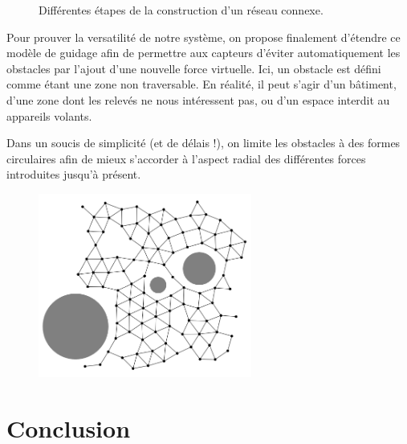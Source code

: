 \documentclass[10pt]{article}
\begin{document}
\begin{figure}[p]

  \caption{Différentes étapes de la construction d'un réseau connexe.}
  \label{demo}

\end{figure}

\begin{multicols}{2}

Pour prouver la versatilité de notre système, on propose finalement
d'étendre ce modèle de guidage afin de permettre aux capteurs d'éviter
automatiquement les obstacles par l'ajout d'une nouvelle force
virtuelle. Ici, un obstacle est défini comme étant une zone non
traversable. En réalité, il peut s'agir d'un bâtiment, d'une zone dont
les relevés ne nous intéressent pas, ou d'un espace interdit au
appareils volants.

Dans un soucis de simplicité (et de délais !), on limite les obstacles
à des formes circulaires afin de mieux s'accorder à l'aspect radial
des différentes forces introduites jusqu'à présent.

\begin{figure}[H]

  \centering

  \includegraphics[width=7cm]{obstacles.png}

  \caption{}
  \label{obstacles}

\end{figure}

\section*{Conclusion}

\end{multicols}



\end{document}
